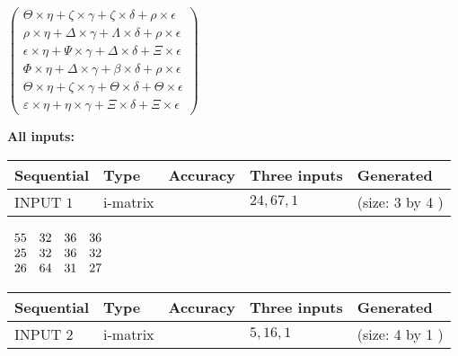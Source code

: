 \documentclass[12pt]{article}
\begin{document}
   
 $  \left( \begin{array}
 {
 c
 }
  \Theta \times  \eta +                     \zeta \times  \gamma +                     \zeta \times  \delta +  \rho \times  \epsilon \\ 
  \rho \times  \eta +  \Delta \times  \gamma +  \Lambda \times  \delta +  \rho \times  \epsilon \\ 
  \epsilon \times  \eta +  \Psi \times  \gamma +  \Delta \times  \delta +                     \Xi \times  \epsilon \\ 
  \Phi \times  \eta +  \Delta \times  \gamma +  \beta \times  \delta +  \rho \times  \epsilon \\ 
  \Theta \times  \eta +                     \zeta \times  \gamma +  \Theta \times  \delta +  \Theta \times  \epsilon \\ 
  \varepsilon \times  \eta +  \eta \times  \gamma +                     \Xi \times  \delta +                     \Xi \times  \epsilon
 \end{array} \right) $ 
   
   
\noindent\vspace{0.1in}\hspace{-0.08in} {\textbf{\Large{All inputs: }}}
   
   
  
  
\noindent\begin{tabular}{|l|l|l|l|l|}
\hline
 Sequential & Type & Accuracy & Three inputs & Generated \\ 
\hline
 
 
  INPUT $            1 $ & i-matrix &  & $
 24
 , 
 67
 , 
 1
 $ & (size:            3  by            4 )
 \\  \hline  
 \end{tabular}
   
   
 $\begin{array}{
 c
 c
 c
 c
 }
          55  & 
          32  & 
          36  & 
          36  \\ 
          25  & 
          32  & 
          36  & 
          32  \\ 
          26  & 
          64  & 
          31  & 
          27
\end{array}  $ 
  
  
\noindent\begin{tabular}{|l|l|l|l|l|}
\hline
 Sequential & Type & Accuracy & Three inputs & Generated \\ 
\hline
 
 
  INPUT $            2 $ & i-matrix &  & $
 5
 , 
 16
 , 
 1
 $ & (size:            4  by            1 )
 \\  \hline  
 \end{tabular}
   
\end{document}
